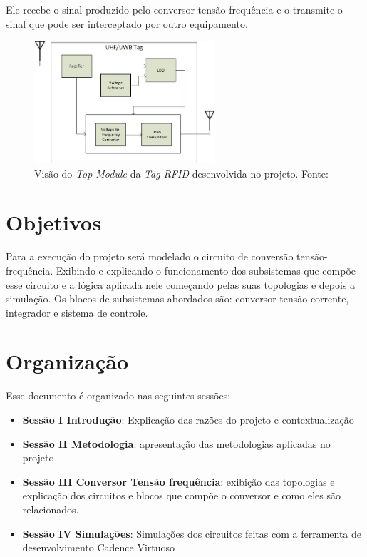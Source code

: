 Ele recebe o sinal produzido pelo conversor tensão frequência e o transmite o sinal que pode ser interceptado por outro equipamento.

\begin{figure}[htb]
	\centering
	\includegraphics[width=0.6\textwidth]{figuras/Top.jpg}
	\caption{Visão do \textit{Top Module} da \textit{Tag RFID} desenvolvida no projeto. Fonte:\cite{artigo_tag_unb} }
	\label{fig02}
\end{figure}

\section{Objetivos}

 Para a execução do projeto será modelado o circuito de conversão tensão-frequência. Exibindo e explicando o funcionamento dos subsistemas que compõe esse circuito e a lógica aplicada nele começando pelas suas topologias e depois a simulação. Os blocos de subsistemas abordados são: conversor tensão corrente, integrador e sistema de controle.

\section{Organização}

Esse documento é organizado nas seguintes sessões:
\begin{itemize}
	\item \textbf{Sessão I Introdução}: Explicação das razões do projeto e contextualização
	\item \textbf{Sessão II Metodologia}: apresentação das metodologias aplicadas no projeto
	\item \textbf{Sessão III Conversor Tensão frequência}: exibição das topologias e explicação dos circuitos e blocos que compõe o conversor e como eles são relacionados.
	\item \textbf{Sessão IV Simulações}: Simulações dos circuitos feitas com a ferramenta de desenvolvimento Cadence Virtuoso
\end{itemize}




